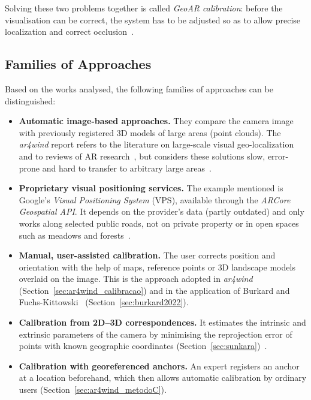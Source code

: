 Solving these two problems together is called \textit{GeoAR calibration}: before the visualisation can be correct, the system has to be adjusted so as to allow precise localization and correct occlusion~\cite{ar4wind2023}.

\subsection{Families of Approaches}
\label{sec:sota_familias}

Based on the works analysed, the following families of approaches can be distinguished:

\begin{itemize}
    \item \textbf{Automatic image-based approaches.} They compare the camera image with previously registered 3D models of large areas (point clouds). The \textit{ar4wind} report refers to the literature on large-scale visual geo-localization~\cite{zamir2018geoloc} and to reviews of AR research~\cite{kim2018ismar}, but considers these solutions slow, error-prone and hard to transfer to arbitrary large areas~\cite[Sec.~1.2 and 2.2.2.1]{ar4wind2023}.
    \item \textbf{Proprietary visual positioning services.} The example mentioned is Google's \textit{Visual Positioning System} (VPS), available through the \textit{ARCore Geospatial API}. It depends on the provider's data (partly outdated) and only works along selected public roads, not on private property or in open spaces such as meadows and forests~\cite[Sec.~2.4]{ar4wind2023}.
    \item \textbf{Manual, user-assisted calibration.} The user corrects position and orientation with the help of maps, reference points or 3D landscape models overlaid on the image. This is the approach adopted in \textit{ar4wind} (Section~\ref{sec:ar4wind_calibracao}) and in the application of Burkard and Fuchs-Kittowski~\cite{burkard2022gistam} (Section~\ref{sec:burkard2022}).
    \item \textbf{Calibration from 2D--3D correspondences.} It estimates the intrinsic and extrinsic parameters of the camera by minimising the reprojection error of points with known geographic coordinates (Section~\ref{sec:sunkara})~\cite{sunkara2025}.
    \item \textbf{Calibration with georeferenced anchors.} An expert registers an anchor at a location beforehand, which then allows automatic calibration by ordinary users (Section~\ref{sec:ar4wind_metodoC}).
\end{itemize}


